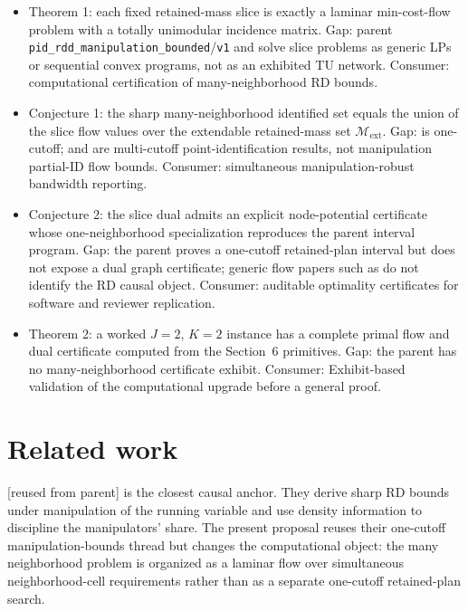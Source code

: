 \documentclass[11pt]{article}
\newcommand{\calM}{\mathcal{M}}
\theoremstyle{definition}
\theoremstyle{plain}
\theoremstyle{remark}
\begin{document}
\begin{itemize}[leftmargin=*]
\item Theorem 1: each fixed retained-mass slice is exactly a laminar min-cost-flow problem with a totally unimodular incidence matrix. Gap: parent \texttt{pid\_rdd\_manipulation\_bounded}/\texttt{v1} and \citet{rosenman_rajkumar_gauriot_slonim_2019_discrete_manipulation} solve slice problems as generic LPs or sequential convex programs, not as an exhibited TU network. Consumer: computational certification of many-neighborhood RD bounds.
\item Conjecture 1: the sharp many-neighborhood identified set equals the union of the slice flow values over the extendable retained-mass set \(\calM_{\mathrm{ext}}\). Gap: \citet{gerard_rokkanen_rothe_2020_rdbounds} is one-cutoff; \citet{bertanha_2020_many_thresholds} and \citet{cattaneo_keele_titiunik_vazquezbare_2021_multicutoff} are multi-cutoff point-identification results, not manipulation partial-ID flow bounds. Consumer: simultaneous manipulation-robust bandwidth reporting.
\item Conjecture 2: the slice dual admits an explicit node-potential certificate whose one-neighborhood specialization reproduces the parent interval program. Gap: the parent proves a one-cutoff retained-plan interval but does not expose a dual graph certificate; generic flow papers such as \citet{orlin_1993_mincostflow} do not identify the RD causal object. Consumer: auditable optimality certificates for software and reviewer replication.
\item Theorem 2: a worked \(J=2\), \(K=2\) instance has a complete primal flow and dual certificate computed from the Section~6 primitives. Gap: the parent has no many-neighborhood certificate exhibit. Consumer: Exhibit-based validation of the computational upgrade before a general proof.
\end{itemize}

\section{Related work}
\citet{gerard_rokkanen_rothe_2020_rdbounds} [reused from parent] is the closest causal
anchor. They derive sharp RD bounds under manipulation of the running variable and use
density information to discipline the manipulators' share. The present proposal reuses
their one-cutoff manipulation-bounds thread but changes the computational object: the many
neighborhood problem is organized as a laminar flow over simultaneous neighborhood-cell
requirements rather than as a separate one-cutoff retained-plan search.
\end{document}
